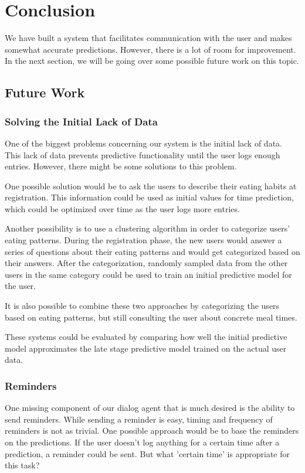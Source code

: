 
\chapter{Conclusion}\label{chapter:conclusion}
We have built a system that facilitates communication with the user and makes somewhat accurate predictions.
However, there is a lot of room for improvement.
In the next section, we will be going over some possible future work on this topic.
\section{Future Work}
\subsection{Solving the Initial Lack of Data}
One of the biggest problems concerning our system is the initial lack of data.
This lack of data prevents predictive functionality until the user logs enough entries.
However, there might be some solutions to this problem.

One possible solution would be to ask the users to describe their eating habits at registration.
This information could be used as initial values for time prediction, which could be optimized over time as the user logs more entries.

Another possibility is to use a clustering algorithm in order to categorize users' eating patterns.
During the registration phase, the new users would answer a series of questions about their eating patterns and would get categorized based on their answers.
After the categorization, randomly sampled data from the other users in the same category could be used to train an initial predictive model for the user.

It is also possible to combine these two approaches by categorizing the users based on eating patterns, but still consulting the user about concrete meal times.

These systems could be evaluated by comparing how well the initial predictive model approximates the late stage predictive model trained on the actual user data.

\subsection{Reminders}
One missing component of our dialog agent that is much desired is the ability to send reminders.
While sending a reminder is easy, timing and frequency of reminders is not as trivial.
One possible approach would be to base the reminders on the predictions.
If the user doesn't log anything for a certain time after a prediction, a reminder could be sent.
But what 'certain time' is appropriate for this task?

